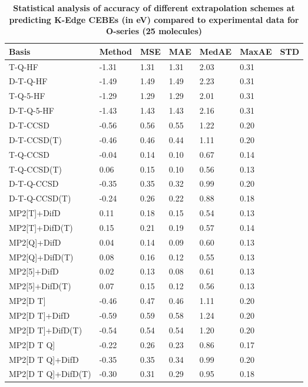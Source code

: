 \begin{table}
  \caption{\textbf{Statistical analysis of accuracy of different extrapolation schemes at predicting K-Edge CEBEs (in eV) compared to experimental data for O-series (25 molecules)}}
  \label{tbl:extrap-scheme-summary-o}
  \begin{tabular}{l l l l l l l }
    \toprule
    \textbf{Basis} & \textbf{Method} & \textbf{MSE} & \textbf{MAE} & \textbf{MedAE} & \textbf{MaxAE} & \textbf{STD} \\ 
    \midrule
    T-Q-HF & -1.31 & 1.31 & 1.31 & 2.03 & 0.31 \\ 
    D-T-Q-HF & -1.49 & 1.49 & 1.49 & 2.23 & 0.31 \\ 
    T-Q-5-HF & -1.29 & 1.29 & 1.29 & 2.01 & 0.31 \\ 
    D-T-Q-5-HF & -1.43 & 1.43 & 1.43 & 2.16 & 0.31 \\ 
    D-T-CCSD & -0.56 & 0.56 & 0.55 & 1.22 & 0.20 \\ 
    D-T-CCSD(T) & -0.46 & 0.46 & 0.44 & 1.11 & 0.20 \\ 
    T-Q-CCSD & -0.04 & 0.14 & 0.10 & 0.67 & 0.14 \\ 
    T-Q-CCSD(T) & 0.06 & 0.15 & 0.10 & 0.56 & 0.13 \\ 
    D-T-Q-CCSD & -0.35 & 0.35 & 0.32 & 0.99 & 0.20 \\ 
    D-T-Q-CCSD(T) & -0.24 & 0.26 & 0.22 & 0.88 & 0.18 \\ 
    MP2[T]+DifD & 0.11 & 0.18 & 0.15 & 0.54 & 0.13 \\ 
    MP2[T]+DifD(T) & 0.15 & 0.21 & 0.19 & 0.57 & 0.14 \\ 
    MP2[Q]+DifD & 0.04 & 0.14 & 0.09 & 0.60 & 0.13 \\ 
    MP2[Q]+DifD(T) & 0.08 & 0.16 & 0.12 & 0.55 & 0.13 \\ 
    MP2[5]+DifD & 0.02 & 0.13 & 0.08 & 0.61 & 0.13 \\ 
    MP2[5]+DifD(T) & 0.07 & 0.15 & 0.12 & 0.56 & 0.13 \\ 
    MP2[D T] & -0.46 & 0.47 & 0.46 & 1.11 & 0.20 \\ 
    MP2[D T]+DifD & -0.59 & 0.59 & 0.58 & 1.24 & 0.20 \\ 
    MP2[D T]+DifD(T) & -0.54 & 0.54 & 0.54 & 1.20 & 0.20 \\ 
    MP2[D T Q] & -0.22 & 0.26 & 0.23 & 0.86 & 0.17 \\ 
    MP2[D T Q]+DifD & -0.35 & 0.35 & 0.34 & 0.99 & 0.20 \\ 
    MP2[D T Q]+DifD(T) & -0.30 & 0.31 & 0.29 & 0.95 & 0.18 \\ 

\end{tabular}
\end{table}
